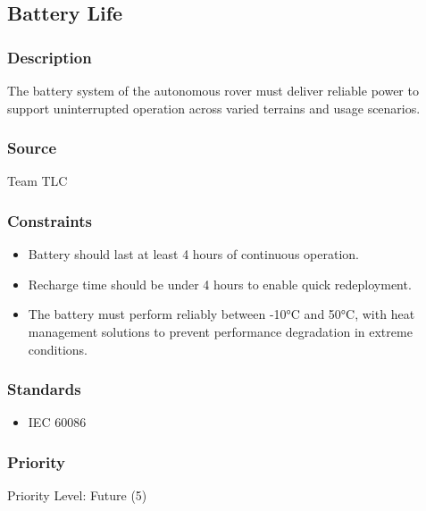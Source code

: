 



\subsection{Battery Life}
\subsubsection{Description}
The battery system of the autonomous rover must deliver reliable power to support uninterrupted operation across varied terrains and usage scenarios.
\subsubsection{Source}
Team TLC
\subsubsection{Constraints}
\begin{itemize}
  \item Battery should last at least 4 hours of continuous operation.
  \item Recharge time should be under 4 hours to enable quick redeployment.
  \item The battery must perform reliably between -10°C and 50°C, with heat management solutions to prevent performance degradation in extreme conditions.
\end{itemize}
\subsubsection{Standards}
\begin{itemize}
    \item IEC 60086 \cite{IECBATT}
\end{itemize}
\subsubsection{Priority}
Priority Level: Future (5)




